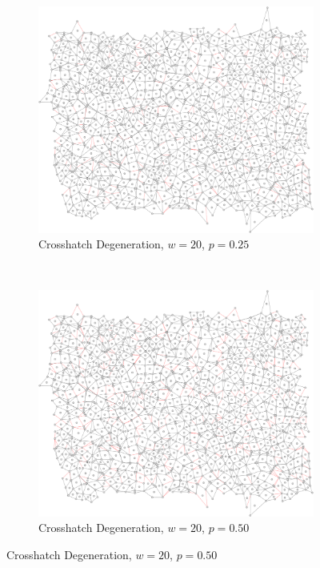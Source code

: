 \documentclass[a4paper,11pt,twoside]{report}
\begin{document}
\begin{figure}[htp]
\centering
\begin{subfigure}[t]{0.4\textwidth}
  \includegraphics[width=\textwidth]{ch6_figs/cross_hatch_p25_w20}
  \caption{Crosshatch Degeneration, $w=20$, $p=0.25$}

\end{subfigure}
~
\begin{subfigure}[t]{0.4\textwidth}
  \centering
  \includegraphics[width=\textwidth]{ch6_figs/cross_hatch_p50_w20}
  \caption{Crosshatch Degeneration, $w=20$, $p=0.50$}


\end{subfigure}
\end{figure}
\end{document}
